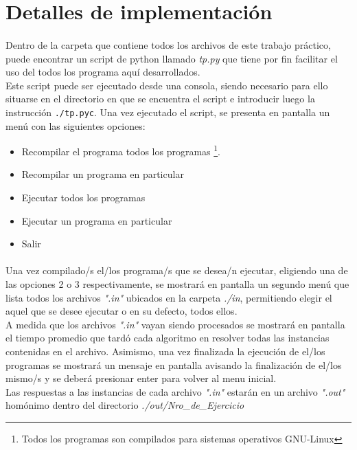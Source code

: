 \section{Detalles de implementación}
\paragraph{}
Dentro de la carpeta que contiene todos los archivos de este trabajo práctico, puede encontrar un script de python llamado \textit{tp.py} que tiene por fin facilitar el uso del todos los programa aquí desarrollados. \\
Este script puede ser ejecutado desde una consola, siendo necesario para ello situarse en el directorio en que se encuentra el script e introducir luego la instrucción \texttt{./tp.pyc}. Una vez ejecutado el script, se presenta en pantalla un menú con las siguientes opciones:
\begin{itemize}
	\item[1] Recompilar el programa todos los programas \footnote{Todos los programas son compilados para sistemas operativos GNU-Linux}.
	\item[2] Recompilar un programa en particular
	\item[3] Ejecutar todos los programas
	\item[4] Ejecutar un programa en particular
	\item[5] Salir
\end{itemize}

\paragraph{}
Una vez compilado/s el/los programa/s que se desea/n ejecutar, eligiendo una de las opciones 2 o 3 respectivamente, se mostrará en pantalla un segundo menú que lista todos los archivos \textit{".in"} ubicados en la carpeta \textit{./in}, permitiendo elegir el aquel que se desee ejecutar o en su defecto, todos ellos. \\
A medida que los archivos \textit{".in"} vayan siendo procesados se mostrará en pantalla el tiempo promedio que tardó cada algoritmo en resolver todas las instancias contenidas en el archivo. Asimismo, una vez finalizada la ejecución de el/los programas
se mostrará un mensaje en pantalla avisando la finalización de el/los mismo/s y se deberá presionar enter para volver al menu inicial. \\
Las respuestas a las instancias de cada archivo \textit{".in"} estarán en un archivo \textit{".out"} homónimo dentro del directorio \textit{./out/Nro\_de\_Ejercicio}

